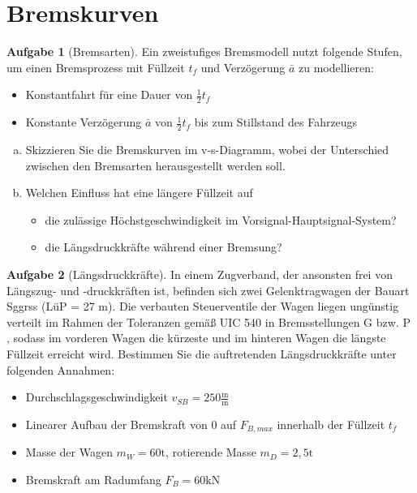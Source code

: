 \documentclass[10pt,a4paper,headsepline,smallheadings]{scrartcl}
\theoremstyle{definition}
\newtheorem{aufgabe}{Aufgabe}
\begin{document}
\section*{Bremskurven}
\begin{aufgabe}[Bremsarten]
Ein zweistufiges Bremsmodell nutzt folgende Stufen, um einen Bremsprozess mit Füllzeit $t_f$ und Verzögerung $\bar{a}$ zu modellieren:
\begin{itemize}
	\item Konstantfahrt für eine Dauer von $\frac12 t_f$
	\item Konstante Verzögerung $\bar{a}$ von $\frac12 t_f$ bis zum Stillstand des Fahrzeugs
\end{itemize}
\begin{enumerate}[a)]
\item Skizzieren Sie die Bremskurven im v-s-Diagramm, wobei der Unterschied zwischen den Bremsarten herausgestellt werden soll.
\item Welchen Einfluss hat eine l\"angere F\"ullzeit auf
\begin{itemize}
	\item die zul\"assige H\"ochstgeschwindigkeit im Vorsignal-Hauptsignal-System?
	\item die L\"angsdruckkr\"afte w\"ahrend einer Bremsung?
\end{itemize}
\end{enumerate}
\end{aufgabe}
\vspace{.5cm}
\begin{aufgabe}[L\"angsdruckkr\"afte]
In einem Zugverband, der ansonsten frei von L\"angszug- und -druckkr\"aften ist, befinden sich zwei Gelenktragwagen der Bauart Sggrss (L\"uP = 27 m). Die verbauten Steuerventile der Wagen liegen ung\"unstig verteilt im Rahmen der Toleranzen gem\"a{\ss} UIC 540 in Bremsstellungen G bzw. P , sodass im vorderen Wagen die k\"urzeste und im hinteren Wagen die l\"angste F\"ullzeit erreicht wird. Bestimmen Sie die auftretenden L\"angsdruckkr\"afte unter folgenden Annahmen:
\begin{itemize}
	\item Durchschlagsgeschwindigkeit $v_{SB} = 250 \frac{\mathrm{m}}{\mathrm{m}}$
	\item Linearer Aufbau der Bremskraft von $0$ auf $F_{B, max}$ innerhalb der F\"ullzeit $t_{f}$
	\item Masse der Wagen $m_{W} = 60 \mathrm{t}$, rotierende Masse $m_{D} = 2{,}5 \mathrm{t}$
	\item Bremskraft am Radumfang $F_{B} = 60 \mathrm{kN}$
\end{itemize}
\end{aufgabe}
\end{document}
